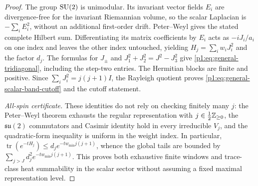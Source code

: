 \documentclass[11pt]{article}
\begin{document}
\begin{proof}
The group $\mathrm{SU}(2)$ is unimodular.  Its invariant vector fields $E_i$
are divergence-free for the invariant Riemannian volume, so the scalar
Laplacian is $-\sum_iE_i^2$, without an additional first-order drift.
Peter--Weyl gives the stated complete Hilbert sum.  Differentiating its
matrix coefficients by $E_i$ acts as $-iJ_i/a_i$ on one index and leaves
the other index untouched, yielding $H_j=\sum_iw_iJ_i^2$ and the factor
$d_j$.  The formulas for $J_\pm$ and
$J_1^2+J_2^2=J^2-J_3^2$ give
\eqref{p1:eq:general-tridiagonal}, including the step-two entries.
The Hermitian blocks are finite and positive.  Since
$\sum_iJ_i^2=j(j+1)I$, the Rayleigh quotient proves
\eqref{p1:eq:general-scalar-band-cutoff} and the cutoff statement.

\emph{All-spin certificate.}  These identities do not rely on checking
finitely many $j$: the Peter--Weyl theorem exhausts the regular
representation with $j\in\frac12\mathbb{Z}_{\ge0}$, the $\mathfrak{su}(2)$
commutators and Casimir identity hold in every irreducible $V_j$, and
the quadratic-form inequality is uniform in the weight index.  In
particular, $\operatorname{tr}(e^{-tH_j})\le d_j
 e^{-tw_{\min}j(j+1)}$, whence the global tails are bounded by
$\sum_{j>J}d_j^2e^{-tw_{\min}j(j+1)}$.  This proves both exhaustive
finite windows and trace-class heat summability in the scalar sector
without assuming a fixed maximal representation level.

\end{proof}
\end{document}
